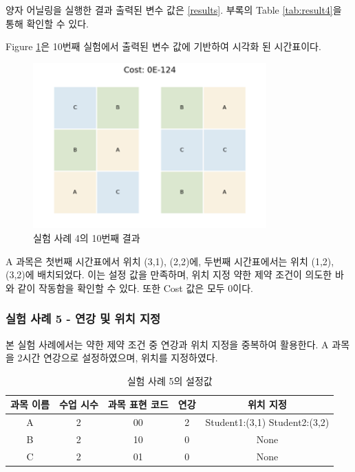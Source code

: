 \documentclass{article}
\begin{document}
양자 어닐링을 실행한 결과 출력된 변수 값은 \ref{results}. 부록의 Table \ref{tab:result4}을 통해 확인할 수 있다.

Figure \ref{fig:case4}은 10번째 실험에서 출력된 변수 값에 기반하여 시각화 된 시간표이다. 

    \begin{figure}[htb!]
        \centering
        \includegraphics[width=0.8\textwidth]{images/Case4.png}
        \caption{실험 사례 4의 10번째 결과}
        \label{fig:case4}
    \end{figure}

A 과목은 첫번째 시간표에서 위치 (3,1), (2,2)에, 두번째 시간표에서는 위치 (1,2), (3,2)에 배치되었다. 이는 설정 값을 만족하며, 위치 지정 약한 제약 조건이 의도한 바와 같이 작동함을 확인할 수 있다. 또한 Cost 값은 모두 0이다.

    \subsubsection{실험 사례 5 - 연강 및 위치 지정}

본 실험 사례에서는 약한 제약 조건 중 연강과 위치 지정을 중복하여 활용한다. A 과목을 2시간 연강으로 설정하였으며, 위치를 지정하였다.

    \begin{table}[htb!]
        \centering
        \begin{tabular}{c c c c c}
             \hline
             과목 이름 & 수업 시수 & 과목 표현 코드 & 연강 & 위치 지정\\
             \hline
             A & 2 & 00 & 2 & Student1:(3,1) Student2:(3,2)\\
             B & 2 & 10 & 0 & None\\
             C & 2 & 01 & 0 & None\\
             \hline
        \end{tabular}
        \caption{실험 사례 5의 설정값}\label{tab:testcase5}
    \end{table}
\end{document}
